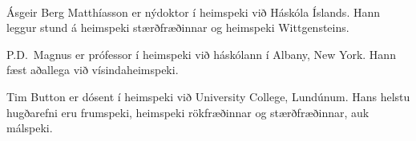 \thispagestyle{empty}
\onecolumn
\ 
\vfill




\vfill

\parbox{3 in}{

Ásgeir Berg Matthíasson er nýdoktor í heimspeki við Háskóla Íslands. Hann leggur stund á heimspeki stærðfræðinnar og heimspeki Wittgensteins.

\medskip

P.D.\ Magnus er prófessor í heimspeki við háskólann í Albany, New York. Hann fæst aðallega við vísindaheimspeki.

\medskip

Tim Button er dósent í heimspeki við University College, Lundúnum. Hans helstu hugðarefni eru frumspeki, heimspeki rökfræðinnar og stærðfræðinnar, auk málspeki.}
\vfill
